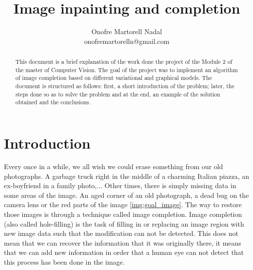 \documentclass[10pt,a4paper]{llncs}
\title{Image inpainting and completion}
\author{Onofre Martorell Nadal\\onofremartorelln@gmail.com}
\institute{Universitat Oberta de Catalunya}
\begin{document}
\maketitle
\thispagestyle{plain}
\begin{abstract}
This document is a brief explanation of the work done the project of the Module 2 of the master of Computer Vision. The goal of the project was to implement an algorithm of image completion based on different variational and graphical models. The document is structured as follows: first, a short introduction of the problem; later, the steps done so as to solve the problem and at the end, an example of the solution obtained and the conclusions.
\end{abstract}
\section{Introduction}
Every once in a while, we all wish we could erase something from
our old photographs. A garbage truck right in the middle of a
charming Italian piazza, an ex-boyfriend in a family photo,...
Other times, there is simply missing data in some areas of the image.
An aged corner of an old photograph, a dead bug on the camera lens or the red parts of the image \ref{img:goal_image}. The way to restore those images is through a technique called image completion.
\noindent
Image completion (also called hole-filling) is the task
of filling in or replacing an image region with new image data such
that the modification can not be detected. This does not mean that we can recover the information that it was originally there, it means that we can add new information in order that a human eye can not detect that this process has been done in the image.
\end{document}
